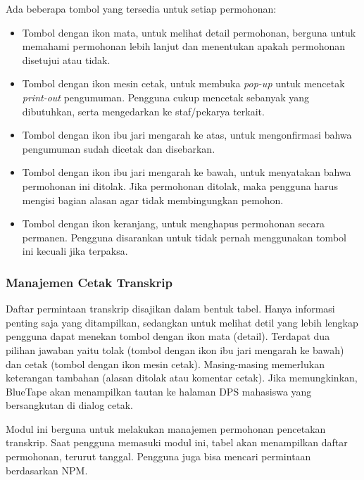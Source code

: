 Ada beberapa tombol yang tersedia untuk setiap permohonan:
\begin{itemize}
	\item Tombol dengan ikon mata, untuk melihat detail permohonan, berguna untuk memahami permohonan lebih lanjut dan menentukan apakah permohonan disetujui atau tidak.
	\item Tombol dengan ikon mesin cetak, untuk membuka \textit{pop-up} untuk mencetak \textit{print-out} pengumuman. Pengguna cukup mencetak sebanyak yang dibutuhkan, serta mengedarkan ke staf/pekarya terkait.
	\item Tombol dengan ikon ibu jari mengarah ke atas, untuk mengonfirmasi bahwa pengumuman sudah dicetak dan disebarkan.
	\item Tombol dengan ikon ibu jari mengarah ke bawah, untuk menyatakan bahwa permohonan ini ditolak. Jika permohonan ditolak, maka pengguna harus mengisi bagian alasan agar tidak membingungkan pemohon.
	\item Tombol dengan ikon keranjang, untuk menghapus permohonan secara permanen. Pengguna disarankan untuk tidak pernah menggunakan tombol ini kecuali jika terpaksa.
\end{itemize}

\subsubsection{Manajemen Cetak Transkrip}
\label{sec:bluetape_manajemen_cetak_transkrip}
Daftar permintaan transkrip disajikan dalam bentuk tabel. Hanya informasi penting saja yang ditampilkan, sedangkan untuk melihat detil yang lebih lengkap pengguna dapat menekan tombol dengan ikon mata (detail). Terdapat dua pilihan jawaban yaitu tolak (tombol dengan ikon ibu jari mengarah ke bawah) dan cetak (tombol dengan ikon mesin cetak). Masing-masing memerlukan keterangan tambahan (alasan ditolak atau komentar cetak). Jika memungkinkan, BlueTape akan menampilkan tautan ke halaman DPS mahasiswa yang bersangkutan di dialog cetak.

Modul ini berguna untuk melakukan manajemen permohonan pencetakan transkrip. Saat pengguna memasuki modul ini, tabel akan menampilkan daftar permohonan, terurut tanggal. Pengguna juga bisa mencari permintaan berdasarkan NPM.


